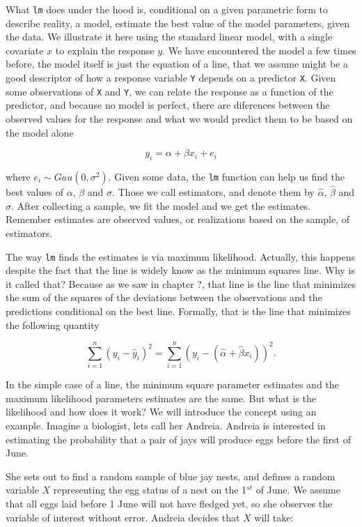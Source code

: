 \documentclass[
]{book}
\begin{document}
What \texttt{lm} does under the hood is, conditional on a given parametric form to describe reality, a model, estimate the best value of the model parameters, given the data. We illustrate it here using the standard linear model, with a single covariate \(x\) to explain the response \(y\). We have encountered the model a few times before, the model itself is just the equation of a line, that we assume might be a good descriptor of how a response variable \texttt{Y} depends on a predictor \texttt{X}. Given some observations of \texttt{X} and \texttt{Y}, we can relate the response as a function of the predictor, and because no model is perfect, there are diferences between the observed values for the response and what we would predict them to be based on the model alone

\[y_i=\alpha+\beta x_i+e_i\]

where \(e_i \sim Gau(0,\sigma^2)\). Given some data, the \texttt{lm} function can help us find the best values of \(\alpha\), \(\beta\) and \(\sigma\). Those we call estimators, and denote them by \(\hat \alpha\), \(\hat \beta\) and \(\hat \sigma\). After collecting a sample, we fit the model and we get the estimates. Remember estimates are observed values, or realizations based on the sample, of estimators.

The way \texttt{lm} finds the estimates is via maximum likelihood. Actually, this happens despite the fact that the line is widely know as the minimum squares line. Why is it called that? Because as we saw in chapter ?, that line is the line that minimizes the sum of the squares of the deviations between the observations and the predictions conditional on the best line. Formally, that is the line that minimizes the following quantity

\[\sum_{i=1}^n (y_i-\hat y_i)^2=\sum_{i=1}^n (y_i-(\hat \alpha+ \hat \beta x_i))^2.\]

In the simple case of a line, the minimum square parameter estimates and the maximum likelihood parameters estimates are the same. But what is the likelihood and how does it work? We will introduce the concept using an example. Imagine a biologist, lets call her Andreia. Andreia is interested in estimating the probability that a pair of jays will produce eggs before the first of June.

She sets out to find a random sample of blue jay nests, and defines a random variable \(X\) representing the egg status of a nest on the 1\(^{st}\) of June. We assume that all eggs laid before 1 June will not have fledged yet, so she observes the variable of interest without error. Andreia decides that \(X\) will take:
\end{document}

